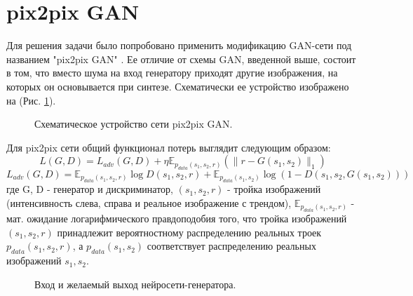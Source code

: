 \documentclass[a4paper]{article}
\begin{document}
	\section{pix2pix GAN}
		Для решения задачи было попробовано применить модификацию GAN-сети под названием "pix2pix GAN" \cite{p2p}. Ее отличие от схемы GAN, введенной выше, состоит в том, что вместо шума на вход генератору приходят другие изображения, на которых он основывается при синтезе. Схематически ее устройство изображено на (Рис. \ref{p2p}).
		\begin{figure}
			\caption{Схематическое устройство сети pix2pix GAN.}
			\label{p2p}
		\end{figure}
		Для pix2pix сети общий функционал потерь выглядит следующим образом: $$ L(G, D) = L_{adv}(G, D) + \eta \mathbb{E}_{p_{data}(s_1, s_2, r)} (\parallel r - G(s_1, s_2) \parallel_1)$$
		$$ L_{adv}(G, D) = \mathbb{E}_{p_{data}(s_1, s_2, r)}\log D(s_1, s_2, r) +  \mathbb{E}_{p_{data}(s_1, s_2)} \log (1 - D(s_1, s_2, G(s_1, s_2)))$$
		где G, D - генератор и дискриминатор, $(s_1, s_2, r)$ - тройка изображений (интенсивность слева, справа и реальное изображение с трендом),  $\mathbb{E}_{p_{data}(s_1, s_2, r)}$ - мат. ожидание логарифмического правдоподобия того, что тройка изображений $(s_1, s_2, r)$ принадлежит вероятностному распределению реальных троек $p_{data}(s_1, s_2, r)$, а $p_{data}(s_1, s_2)$ соответствует распределению реальных изображений $s_1, s_2$.
		\begin{figure}
			\caption{Вход и желаемый выход нейросети-генератора.}
			\label{p2p-gen}
		\end{figure}
\end{document}
